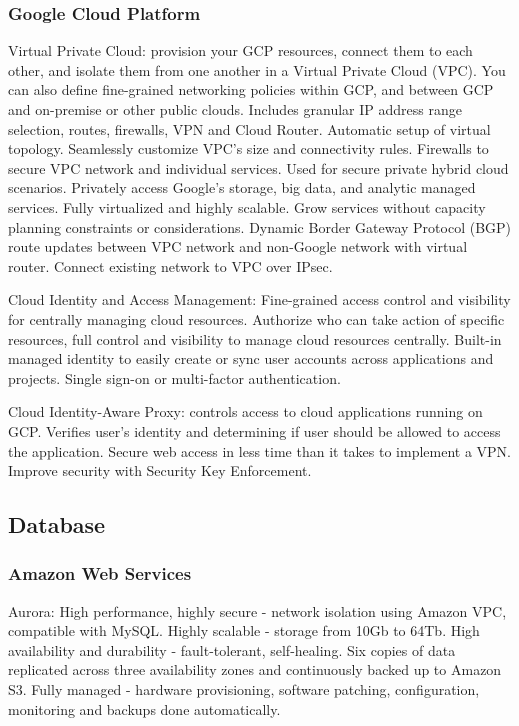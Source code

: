 \subsubsection{Google Cloud Platform}
Virtual Private Cloud: provision your GCP resources, connect them to each other, and isolate them from one another in a Virtual Private Cloud (VPC). You can also define fine-grained networking policies within GCP, and between GCP and on-premise or other public clouds. Includes granular IP address range selection, routes, firewalls, VPN and Cloud Router. Automatic setup of virtual topology. Seamlessly customize VPC's size and connectivity rules. Firewalls to secure VPC network and individual services. Used for secure private hybrid cloud scenarios. Privately access Google's storage, big data, and analytic managed services. Fully virtualized and highly scalable. Grow services without capacity planning constraints or considerations. Dynamic Border Gateway Protocol (BGP) route updates between VPC network and non-Google network with virtual router. Connect existing network to VPC over IPsec. 

Cloud Identity and Access Management: Fine-grained access control and visibility for centrally managing cloud resources. Authorize who can take action of specific resources, full control and visibility to manage cloud resources centrally. Built-in managed identity to easily create or sync user accounts across applications and projects. Single sign-on or multi-factor authentication. 

Cloud Identity-Aware Proxy: controls access to cloud applications running on GCP. Verifies user's identity and determining if user should be allowed to access the application. Secure web access in less time than it takes to implement a VPN. Improve security with Security Key Enforcement. 

\subsection{Database}

\subsubsection{Amazon Web Services}
Aurora: High performance, highly secure - network isolation using Amazon VPC, compatible with MySQL. Highly scalable - storage from 10Gb to 64Tb. High availability and durability - fault-tolerant, self-healing. Six copies of data replicated across three availability zones and continuously backed up to Amazon S3. Fully managed - hardware provisioning, software patching, configuration, monitoring and backups done automatically. 


